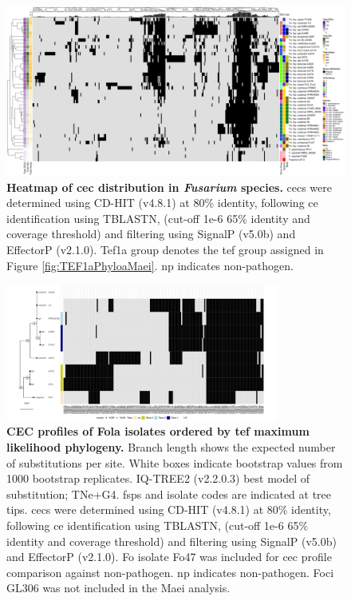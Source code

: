 \begin{figure}
    \centering
    \includegraphics[width=\textwidth]{Figures/EffectorsHeatmap.png}
    \captionsetup{width=24cm}
    \caption[Heatmap of \acl{cec}s distribution in \textit{Fusarium} species.]{\textbf{Heatmap of \acf{cec} distribution in \textit{Fusarium} species.} \Acp{cec} were determined using CD-HIT (v4.8.1) at 80\% identity, following \ac{ce} identification using TBLASTN, (cut-off 1e-6 65\% identity and coverage threshold) and filtering using SignalP (v5.0b) and EffectorP (v2.1.0). Tef1a group denotes the \ac{tef} group assigned in Figure \ref{fig:TEF1aPhyloaMaei}. np indicates non-pathogen.}
    \label{fig:MaeiHeatmap}
\end{figure}

\begin{figure}
    \centering
    \includegraphics[width=0.8\textwidth]{Figures/HeatmapAndPhylo_ApiiAndCoriandriiOnly.png}
    \captionsetup{width=20cm}
    \caption[CEC profiles of \ac{Fola} isolates ordered by \ac{tef} maximum likelihood phylogeny.]{\textbf{CEC profiles of \ac{Fola} isolates ordered by \ac{tef} maximum likelihood phylogeny.} Branch length shows the expected number of substitutions per site. White boxes indicate bootstrap values from 1000 bootstrap replicates. IQ-TREE2 (v2.2.0.3) best model of substitution; TNe+G4. \Acfp{fsp} and isolate codes are indicated at tree tips. \Acp{cec} were determined using CD-HIT (v4.8.1) at 80\% identity, following \ac{ce} identification using TBLASTN, (cut-off 1e-6 65\% identity and coverage threshold) and filtering using SignalP (v5.0b) and EffectorP (v2.1.0). \ac{Fo} isolate Fo47 was included for \ac{cec} profile comparison against non-pathogen. np indicates non-pathogen. \ac{Foci} GL306 was not included in the \ac{Maei} analysis.}
    \label{fig:Maei_celeryandcoriander}
\end{figure}


